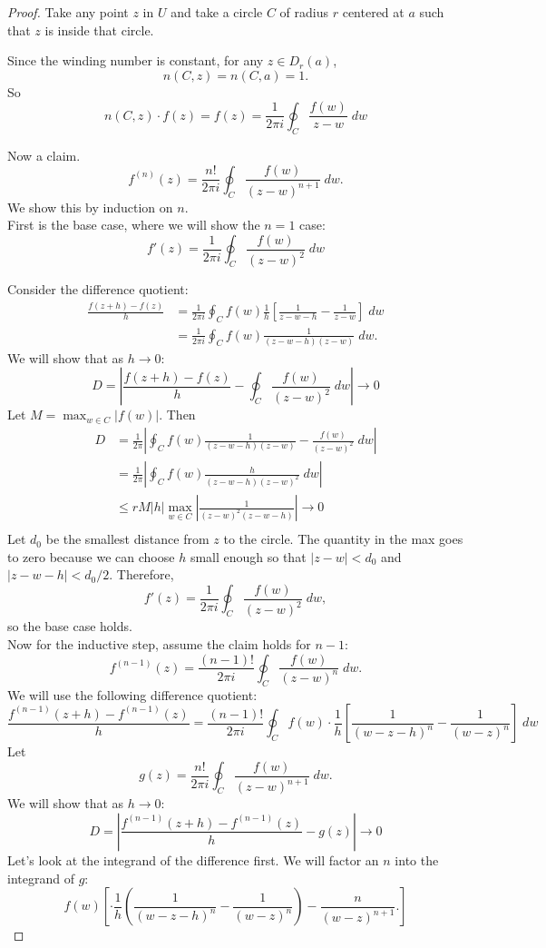 \documentclass[notes]{subfile}
\begin{document}
\begin{proof}
    Take any point $z$ in $U$ and take a circle $C$ of radius $r$ centered at $a$
    such that $z$ is inside that circle.
    
    Since the winding number is constant, for any $z \in D_r (a)$,
    \[ n(C, z) = n(C, a) = 1. \]
    So
    \[ n(C,z) \cdot f(z) = f(z) = \frac{1}{2\pi i} 
    \oint_{C} \frac{f(w)}{z-w} \; dw \]

    Now a claim.
    \[ f^{(n)} (z) = \frac{n!}{2\pi i} \oint_{C} \frac{f(w)}{(z-w)^{n+1}} \; dw. \]
    We show this by induction on $n$. \\

    First is the base case, where we will show the $n=1$ case:
    \[ f'(z) = \frac{1}{2 \pi i} \oint_C \frac{f(w)}{(z-w)^2} \; dw \]

    Consider the difference quotient:
    \begin{align*}
        \frac{f(z+h) - f(z)}{h} &= 
    \frac{1}{2\pi i} \oint_C f(w) \frac{1}{h} \left[ \frac{1}{z-w-h} - \frac{1}{z-w} \right] \; dw \\
        &= \frac{1}{2\pi i} \oint_C f(w) \frac{1}{(z-w-h)(z-w)} \; dw.
    \end{align*}
    We will show that as $h \to 0$:
    \[D = \left| \frac{f(z+h) - f(z)}{h} -\oint_C \frac{f(w)}{(z-w)^2} \; dw \right| \to 0\]
    Let $M = \max_{w \in C} |f(w)|$. Then
    \begin{align*}
        D &= \frac{1}{2\pi} \left| \oint_C f(w) \frac{1}{(z-w-h)(z-w)} - \frac{f(w)}{(z-w)^2} \; dw \right| \\
        &= \frac{1}{2\pi} \left| \oint_C f(w) \frac{h}{(z-w-h)(z-w)^2} \; dw \right| \\
        &\le rM |h| \max_{w \in C} \left| \frac{1}{(z-w)^2(z-w-h)} \right| \to 0 \\
    \end{align*}
    Let $d_0$ be the smallest distance from $z$ to the circle.
    The quantity in the max goes to zero because we can choose $h$ small enough so that $|z-w| < d_0$ and $|z-w-h| < d_0/2$.
    Therefore,
    \[ f'(z) = \frac{1}{2 \pi i} \oint_C \frac{f(w)}{(z-w)^2} \; dw, \]
    so the base case holds. \\

    Now for the inductive step, assume the claim holds for $n-1$:
    \[ f^{(n-1)} (z) = \frac{(n-1)!}{2\pi i} 
    \oint_C \frac{f(w)}{(z-w)^n} \; dw. \]
    We will use the following difference quotient:
    \[ \frac{f^{(n-1)}(z+h) - f^{(n-1)}(z)}{h} = 
        \frac{(n-1)!}{2\pi i} \oint_C f(w) \cdot \frac{1}{h}
    \left[ \frac{1}{(w-z-h)^n} - \frac{1}{(w-z)^n} \right] \; dw \]
    Let 
    \[g(z) = \frac{n!}{2\pi i}\oint_C \frac{f(w)}{(z-w)^{n+1}} \; dw. \]
    We will show that as $h \to 0$:
    \[ D = \left| \frac{f^{(n-1)}(z+h) - f^{(n-1)}(z)}{h} - g(z)
    \right| \to 0 \]
    Let's look at the integrand of the difference first.
    We will factor an $n$ into the integrand of $g$:
    \[ f(w) \left[ \cdot \frac{1}{h} \left( \frac{1}{(w-z-h)^n} - \frac{1}{(w-z)^n}\right) - \frac{n}{(w-z)^{n+1}}. \right] \]


\end{proof}
\end{document}
